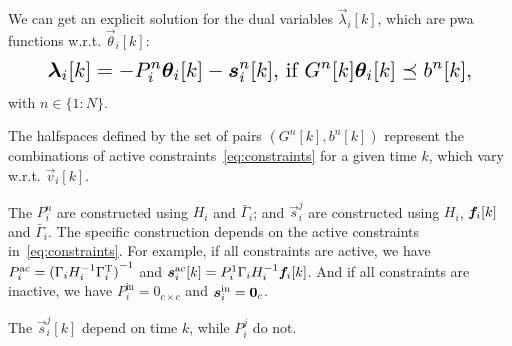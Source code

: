 \documentclass{ifacconf}  %
\begin{document}
We can get an explicit solution for the dual variables $\vec{\lambda}_{i}[k]$, which are \acrfull{pwa} functions w.r.t. $\vec{\theta}_{i}[k]$:
\begin{equation}
\resizebox{.88\columnwidth}{!}{$
  \begin{aligned}\label{eq:lambdafuntheta}
    \lambdaik=
      -P_{i}^{n}\thetaik-\vec{s}_{i}^{n}[k]\text{, if}\ G^{n}[k]\thetaik \preceq b^{n}[k],
  \end{aligned}
  $}
\end{equation}
with $n\in\{1\mathbin{:}N\}$.

The halfspaces defined by the set of pairs $(G^{n}[k],b^{n}[k])$ represent the combinations of active constraints~\eqref{eq:constraints} for a given time $k$, which vary w.r.t. $\vec{v}_{i}[k]$.

The $P_{i}^{n}$ are constructed using $H_{i}$ and $\bar{\Gamma}_{i}$; and $\vec{s}_{i}^{j}$ are constructed using $H_{i}$, $\fik$ and $\bar{\Gamma}_{i}$. The specific construction depends on the active constraints in~\eqref{eq:constraints}.
For example, if all constraints are active, we have ${P_{i}^{\text{ac}}={(\relax{\Gamma}_{i}H_{i}^{-1}\relax{\Gamma}_{i}^{\mathrm{T}})}^{-1}}$ and ${\vec{s}_{i}^{\text{ac}}[k]=P_{i}^{1}\bar{\Gamma}_{i}H_{i}^{-1}\fik}$.
And if all constraints are inactive, we have ${P_{i}^{\text{in}}=0_{c\times c}}$ and ${\boldsymbol{s}_{i}^{\text{in}}=\mathbf{0}_{c}}$.

\begin{remark}\label{rmk:P_constant}
The $\vec{s}_{i}^{j}[k]$ depend on time $k$, while $P_{i}^{j}$ do not.
\end{remark}
\end{document}
